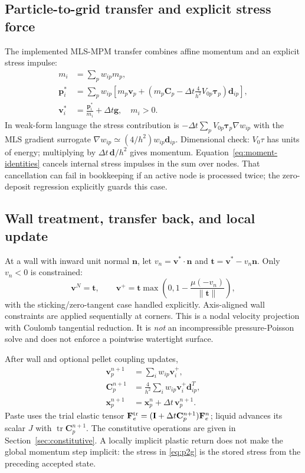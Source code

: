 \subsection{Particle-to-grid transfer and explicit stress force}
The implemented MLS-MPM transfer \cite{mlsmpm} combines affine momentum and an
explicit stress impulse:
\begin{align}
 m_i&=\sum_pw_{ip}m_p,\\
 \mathbf{p}_i^*&=\sum_pw_{ip}\left[m_p\mathbf{v}_p+
 \left(m_p\mathbf{C}_p-\Delta t\frac4{h^2}V_{0p}\boldsymbol\tau_p\right)
          \mathbf{d}_{ip}\right], \label{eq:p2g}\\
 \mathbf{v}_i^*&=\frac{\mathbf{p}_i^*}{m_i}+\Delta t\mathbf{g},\quad m_i>0.
\end{align}
In weak-form language the stress contribution is
$-\Delta t\sum_pV_{0p}\boldsymbol\tau_p\nabla w_{ip}$ with the MLS gradient
surrogate $\nabla w_{ip}\simeq(4/h^2)w_{ip}\mathbf{d}_{ip}$.
Dimensional check: $V_0\tau$ has units of energy; multiplying by
$\Delta t\,\mathbf{d}/h^2$ gives momentum.
Equation~\eqref{eq:moment-identities} cancels internal stress impulses in the
sum over nodes. That cancellation can fail in bookkeeping if an active node
is processed twice; the zero-deposit regression explicitly guards this case.

\subsection{Wall treatment, transfer back, and local update}
At a wall with inward unit normal $\mathbf{n}$, let
$v_n=\mathbf{v}^*\cdot\mathbf{n}$ and
$\mathbf{t}=\mathbf{v}^*-v_n\mathbf{n}$. Only $v_n<0$ is constrained:
\begin{equation}
 \mathbf{v}^{N}=\mathbf{t},\qquad
 \mathbf{v}^{+}=\mathbf{t}
 \max\left(0,1-\frac{\mu(-v_n)}{\|\mathbf{t}\|}\right), \label{eq:wall-projection}
\end{equation}
with the sticking/zero-tangent case handled explicitly. Axis-aligned wall
constraints are applied sequentially at corners. This is a nodal velocity
projection with Coulomb tangential reduction. It is \emph{not} an incompressible
pressure-Poisson solve and does not enforce a pointwise watertight surface.

After wall and optional pellet coupling updates,
\begin{align}
 \mathbf{v}_p^{n+1}&=\sum_iw_{ip}\mathbf{v}_i^+,\\
 \mathbf{C}_p^{n+1}&=\frac4{h^2}\sum_iw_{ip}\mathbf{v}_i^+
                           \mathbf{d}_{ip}^{T}, \label{eq:g2p}\\
 \mathbf{x}_p^{n+1}&=\mathbf{x}_p^n+\Delta t\,\mathbf{v}_p^{n+1}.
\end{align}
Paste uses the trial elastic tensor
$\mathbf{F}_e^{\rm tr}=(\mathbf{I}+\Delta t\mathbf{C}_p^{n+1})\mathbf{F}_e^n$;
liquid advances its scalar $J$ with $\operatorname{tr}\mathbf{C}_p^{n+1}$.
The constitutive operations are given in Section~\ref{sec:constitutive}.
A locally implicit plastic return does not make the global momentum step
implicit: the stress in \eqref{eq:p2g} is the stored stress from the preceding
accepted state.

